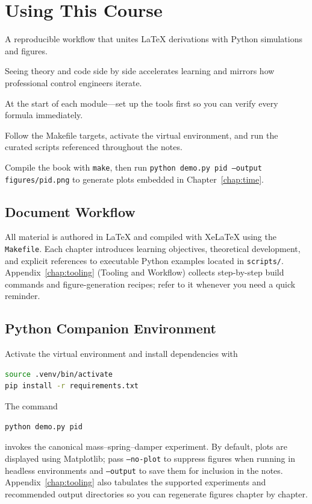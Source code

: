 \section{Using This Course}
\begin{beginnerguide}
    \item[\textbf{What?}] A reproducible workflow that unites \LaTeX{} derivations with Python simulations and figures.
    \item[\textbf{Why?}] Seeing theory and code side by side accelerates learning and mirrors how professional control engineers iterate.
    \item[\textbf{When?}] At the start of each module—set up the tools first so you can verify every formula immediately.
    \item[\textbf{How?}] Follow the Makefile targets, activate the virtual environment, and run the curated scripts referenced throughout the notes.
    \item[\textbf{Example}] Compile the book with \texttt{make}, then run \texttt{python demo.py pid --output figures/pid.png} to generate plots embedded in Chapter~\ref{chap:time}.
\end{beginnerguide}
\subsection{Document Workflow}
All material is authored in \LaTeX{} and compiled with Xe\LaTeX{} using the \texttt{Makefile}. Each chapter introduces learning objectives, theoretical development, and explicit references to executable Python examples located in \texttt{scripts/}. Appendix~\ref{chap:tooling} (Tooling and Workflow) collects step-by-step build commands and figure-generation recipes; refer to it whenever you need a quick reminder.

\subsection{Python Companion Environment}
Activate the virtual environment and install dependencies with
\begin{lstlisting}[language=bash]
source .venv/bin/activate
pip install -r requirements.txt
\end{lstlisting}
The command
\begin{lstlisting}[language=bash]
python demo.py pid
\end{lstlisting}
invokes the canonical mass--spring--damper experiment. By default, plots are displayed using Matplotlib; pass \texttt{--no-plot} to suppress figures when running in headless environments and \texttt{--output} to save them for inclusion in the notes.
Appendix~\ref{chap:tooling} also tabulates the supported experiments and recommended output directories so you can regenerate figures chapter by chapter.

